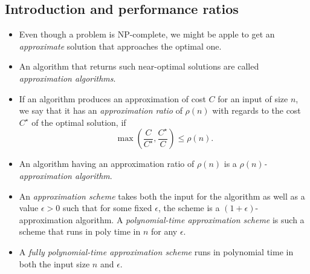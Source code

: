 \subsection{Introduction and performance ratios}
\begin{itemize}
\item Even though a problem is NP-complete, we might be apple to get
  an \emph{approximate} solution that approaches the optimal one.
\item An algorithm that returns such near-optimal solutions are called
  \emph{approximation algorithms}.
\item If an algorithm produces an approximation of cost $C$ for an
  input of size $n$, we say that it has an \emph{approximation ratio}
  of $\rho(n)$ with regards to the cost $C^\star$ of the optimal
  solution, if
$$
 \max\left(\frac{C}{C^\star}, \frac{C^\star}{C}\right) \leq \rho(n).
$$
\item An algorithm having an approximation ratio of $\rho(n)$ is a
  \emph{$\rho(n)$-approximation algorithm}.
\item An \emph{approximation scheme} takes both the input for the
  algorithm as well as a value $\epsilon >0$ such that for some fixed
  $\epsilon$, the scheme is a $(1+\epsilon)$-approximation
  algorithm. A \emph{polynomial-time approximation scheme} is such a
  scheme that runs in poly time in $n$ for any $\epsilon$.
\item A \emph{fully polynomial-time approximation scheme} runs in
  polynomial time in both the input size $n$ and $\epsilon$.
\end{itemize}

